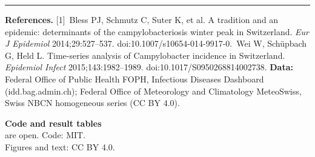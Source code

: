 \documentclass{article}
\newcommand{\Tiny}{\fontsize{12.5}{16}\selectfont\color{ink2}}
\begin{document}
\vfill
{\color{rule}\rule{\textwidth}{1.2pt}}\vspace{5pt}
\begin{minipage}[t]{0.80\textwidth}\vspace{0pt}
{\Tiny\textbf{\color{ink}References.}
[1]~Bless PJ, Schmutz C, Suter K, et al. A tradition and an epidemic: determinants of the campylobacteriosis winter peak in Switzerland. \emph{Eur J Epidemiol} 2014;29:527--537. \mbox{doi:10.1007/s10654-014-9917-0}.\;
[2]~Wei W, Schüpbach G, Held L. Time-series analysis of Campylobacter incidence in Switzerland. \emph{Epidemiol Infect} 2015;143:1982--1989. \mbox{doi:10.1017/S0950268814002738}.\;
\textbf{\color{ink}Data:} Federal Office of Public Health FOPH, Infectious Diseases Dashboard (idd.bag.admin.ch); Federal Office of Meteorology and Climatology MeteoSwiss, Swiss NBCN homogeneous series (CC BY 4.0).\par}
\end{minipage}\hfill
\begin{minipage}[t]{0.18\textwidth}\vspace{0pt}\raggedleft
{\Tiny\textbf{\color{ink}Code and result tables}\\ are open. Code: MIT.\\ Figures and text: CC BY 4.0.\par}
\end{minipage}
\end{document}
